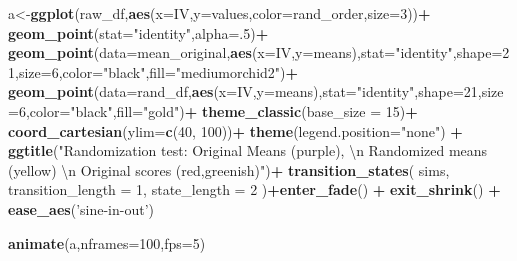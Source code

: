 \documentclass[
]{book}
\newenvironment{Shaded}{\begin{snugshade}}{\end{snugshade}}
\newcommand{\CharTok}[1]{\textcolor[rgb]{0.31,0.60,0.02}{#1}}
\newcommand{\DataTypeTok}[1]{\textcolor[rgb]{0.13,0.29,0.53}{#1}}
\newcommand{\DecValTok}[1]{\textcolor[rgb]{0.00,0.00,0.81}{#1}}
\newcommand{\KeywordTok}[1]{\textcolor[rgb]{0.13,0.29,0.53}{\textbf{#1}}}
\newcommand{\NormalTok}[1]{#1}
\newcommand{\OperatorTok}[1]{\textcolor[rgb]{0.81,0.36,0.00}{\textbf{#1}}}
\newcommand{\StringTok}[1]{\textcolor[rgb]{0.31,0.60,0.02}{#1}}
\begin{document}
\begin{Shaded}
\begin{Highlighting}[]
\NormalTok{a<-}\KeywordTok{ggplot}\NormalTok{(raw_df,}\KeywordTok{aes}\NormalTok{(}\DataTypeTok{x=}\NormalTok{IV,}\DataTypeTok{y=}\NormalTok{values,}\DataTypeTok{color=}\NormalTok{rand_order,}\DataTypeTok{size=}\DecValTok{3}\NormalTok{))}\OperatorTok{+}
\StringTok{  }\KeywordTok{geom_point}\NormalTok{(}\DataTypeTok{stat=}\StringTok{"identity"}\NormalTok{,}\DataTypeTok{alpha=}\NormalTok{.}\DecValTok{5}\NormalTok{)}\OperatorTok{+}
\StringTok{  }\KeywordTok{geom_point}\NormalTok{(}\DataTypeTok{data=}\NormalTok{mean_original,}\KeywordTok{aes}\NormalTok{(}\DataTypeTok{x=}\NormalTok{IV,}\DataTypeTok{y=}\NormalTok{means),}\DataTypeTok{stat=}\StringTok{"identity"}\NormalTok{,}\DataTypeTok{shape=}\DecValTok{21}\NormalTok{,}\DataTypeTok{size=}\DecValTok{6}\NormalTok{,}\DataTypeTok{color=}\StringTok{"black"}\NormalTok{,}\DataTypeTok{fill=}\StringTok{"mediumorchid2"}\NormalTok{)}\OperatorTok{+}
\StringTok{  }\KeywordTok{geom_point}\NormalTok{(}\DataTypeTok{data=}\NormalTok{rand_df,}\KeywordTok{aes}\NormalTok{(}\DataTypeTok{x=}\NormalTok{IV,}\DataTypeTok{y=}\NormalTok{means),}\DataTypeTok{stat=}\StringTok{"identity"}\NormalTok{,}\DataTypeTok{shape=}\DecValTok{21}\NormalTok{,}\DataTypeTok{size=}\DecValTok{6}\NormalTok{,}\DataTypeTok{color=}\StringTok{"black"}\NormalTok{,}\DataTypeTok{fill=}\StringTok{"gold"}\NormalTok{)}\OperatorTok{+}
\StringTok{  }\KeywordTok{theme_classic}\NormalTok{(}\DataTypeTok{base_size =} \DecValTok{15}\NormalTok{)}\OperatorTok{+}
\StringTok{  }\KeywordTok{coord_cartesian}\NormalTok{(}\DataTypeTok{ylim=}\KeywordTok{c}\NormalTok{(}\DecValTok{40}\NormalTok{, }\DecValTok{100}\NormalTok{))}\OperatorTok{+}
\StringTok{  }\KeywordTok{theme}\NormalTok{(}\DataTypeTok{legend.position=}\StringTok{"none"}\NormalTok{) }\OperatorTok{+}
\StringTok{  }\KeywordTok{ggtitle}\NormalTok{(}\StringTok{"Randomization test: Original Means (purple), }
\StringTok{          }\CharTok{\textbackslash{}n}\StringTok{ Randomized means (yellow)}
\StringTok{          }\CharTok{\textbackslash{}n}\StringTok{ Original scores (red,greenish)"}\NormalTok{)}\OperatorTok{+}
\StringTok{  }\KeywordTok{transition_states}\NormalTok{(}
\NormalTok{    sims,}
    \DataTypeTok{transition_length =} \DecValTok{1}\NormalTok{,}
    \DataTypeTok{state_length =} \DecValTok{2}
\NormalTok{  )}\OperatorTok{+}\KeywordTok{enter_fade}\NormalTok{() }\OperatorTok{+}\StringTok{ }
\StringTok{  }\KeywordTok{exit_shrink}\NormalTok{() }\OperatorTok{+}
\StringTok{  }\KeywordTok{ease_aes}\NormalTok{(}\StringTok{'sine-in-out'}\NormalTok{)}

\KeywordTok{animate}\NormalTok{(a,}\DataTypeTok{nframes=}\DecValTok{100}\NormalTok{,}\DataTypeTok{fps=}\DecValTok{5}\NormalTok{)}
\end{Highlighting}
\end{Shaded}
\end{document}
